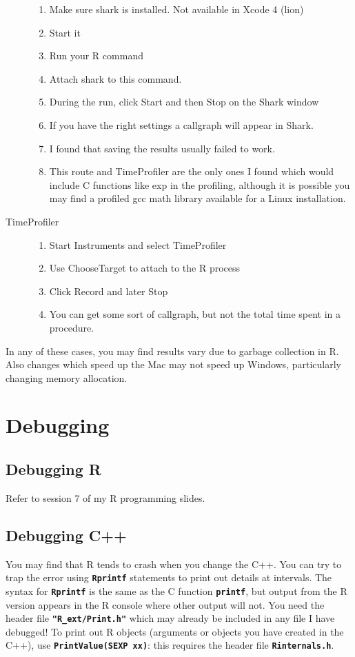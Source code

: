 \documentclass[12pt, a4paper]{article}
\renewcommand{\=}{\,=\,}
\newcommand{\+}{\,+\,}
\newcommand{\sfn}[1]{\textbf{\texttt{#1}}}
\begin{document}
\begin{description}
\begin{enumerate}
\item Make sure shark is installed. Not available in Xcode 4 (lion)
\item Start it
\item Run your R command
\item Attach shark to this command.
\item During the run, click Start and then Stop  on the Shark window
\item If you have the right settings a callgraph will appear in Shark.
\item I found that saving the results usually failed to work.
\item This route and TimeProfiler are the only ones I found which would include
  C functions like exp in the profiling, although it is possible you may find a
  profiled gcc math library available for a Linux installation.
\end{enumerate}
\item[TimeProfiler]
\begin{enumerate}
\item Start Instruments and select TimeProfiler
\item Use ChooseTarget to attach to the R process
\item Click Record and later Stop
\item You can get some sort of callgraph, but not the total time spent in a
  procedure.
\end{enumerate}
\end{description}

In any of these cases, you may find results vary due to garbage
collection in R. Also changes which speed up the Mac may not speed up Windows,
particularly changing memory allocation.
\section{Debugging}

\subsection{Debugging R}
Refer to session 7 of my R programming slides.
\subsection{Debugging C++}
You may find that R tends to crash when you change the C++. You can try to trap
the error using \sfn{Rprintf} statements to print out details at intervals. The
syntax for \sfn{Rprintf} is the same as the C function \sfn{printf}, but output
from the R version appears in the R console where other output will not. You
need the header file \sfn{"R\_ext/Print.h"} which may already be
included in any file I have debugged! To print out R objects (arguments or
objects you have created in the C++), use
\sfn{PrintValue(SEXP xx)}: this requires the header file \sfn{Rinternals.h}.
\end{document}
